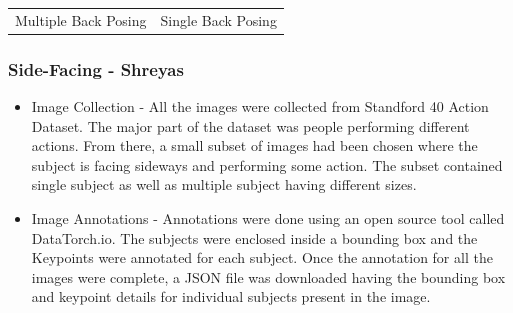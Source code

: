 \documentclass[a4paper,12pt]{article}
\begin{document}
\begin{center}
\begin{tabular}{cc}
\\
Multiple Back Posing & Single Back Posing
\end{tabular}
\end{center}

\subsubsection{Side-Facing - Shreyas}

\begin{itemize}
    \item Image Collection - All the images were collected from Standford 40 Action Dataset. The major part of the dataset was people performing different actions. From there, a small subset of images had been chosen where the subject is facing sideways and performing some action. The subset contained single subject as well as multiple subject having different sizes. 
    \item Image Annotations - Annotations were done using an open source tool called DataTorch.io. The subjects were enclosed inside a bounding box and the Keypoints were annotated for each subject. Once the annotation for all the images were complete, a JSON file was downloaded having the bounding box and keypoint details for individual subjects present in the image.
\end{itemize}
\end{document}

